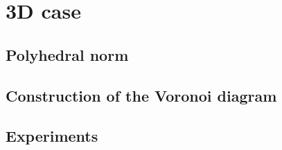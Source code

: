\chapter{3D case}

\section{Polyhedral norm}

\section{Construction of the Voronoi diagram}

\section{Experiments}

